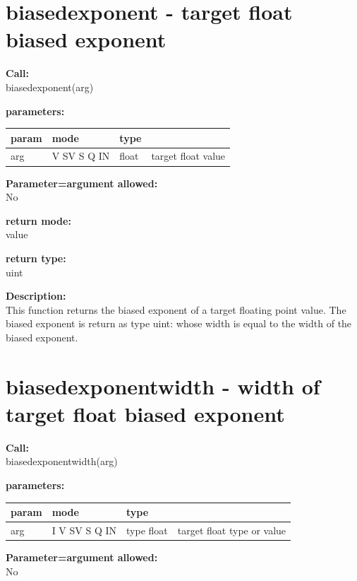     \section{biasedexponent - target float biased exponent}\label{sec:ifbiasedexponent}
        
        {\bf Call:} \\
        biasedexponent(arg)
        
        {\bf parameters:} \\
        \begin{tabular}{| l | l | l | l |}
        \hline
        param  & mode & type & \\
        \hline \hline
        arg  & V SV S Q IN & float & target float value  \\ \hline
        \end{tabular}
        
        {\bf Parameter=argument allowed:} \\
        No
        
        {\bf return mode:} \\
        value

        {\bf return type:} \\
        uint
        
        {\bf Description:} \\
        This function returns the biased exponent of a target floating point
        value. The biased exponent is return as type uint: whose width is
        equal to the width of the biased exponent.


    \section{biasedexponentwidth - width of target float biased exponent}\label{sec:ifbiasedexponentwidth}
        
        {\bf Call:} \\
        biasedexponentwidth(arg)
        
        {\bf parameters:} \\
        \begin{tabular}{| l | l | l | l |}
        \hline
        param  & mode & type & \\
        \hline \hline
        arg  & I V SV S Q IN & type float & target float type or value  \\ \hline
        \end{tabular}
        
        {\bf Parameter=argument allowed:} \\
        No
        

